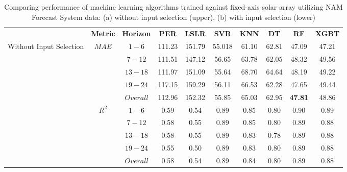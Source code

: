 \begin{table}[h]
\begin{center}
    \caption[Comparing performance of machine learning algorithms trained against fixed-axis solar array using NAM Forecast System data, with and without input selection.]{Comparing performance of machine learning algorithms trained against fixed-axis solar array utilizing NAM Forecast System data: (a) without input selection (upper), (b) with input selection (lower)}
    \label{Tab:fs_array_b}
    \begin{tabular}{@{}p{5.3em}ccccccccc@{}}
    \toprule
    & \textbf{Metric} & \textbf{Horizon} & \textbf{PER} & \textbf{LSLR} & \textbf{SVR} & \textbf{KNN} & \textbf{DT} & \textbf{RF} & \textbf{XGBT} \\ \cmidrule(l){1-10} 
    \multirow{10}{5em}{Without Input Selection} & \multirow{5}{*}{$MAE$} & $1 - 6$ & 111.23 & 151.79 & 55.018 & 61.10 & 62.81 & 47.09 & 47.21 \\
                                              &                   & $7 - 12$ & 111.51 & 147.12 & 56.65 & 63.78 & 62.05 & 48.32 & 49.56 \\
                                              &                   & $13 - 18$ & 111.97 & 151.09 & 55.64 & 68.70 & 64.64 & 48.19 & 49.22 \\
                                              &                   & $19 - 24$ & 117.15 & 159.29 & 56.11 & 66.53 & 62.28 & 47.65 & 49.44 \\
                                              &                   & $Overall$ & 112.96 & 152.32 & 55.85 & 65.03 & 62.95 & \textbf{47.81} & 48.86 \\ \cmidrule(lr){2-10}
                                              & \multirow{5}{*}{$R^2$} & $1 - 6$ & 0.59 & 0.54 & 0.89 & 0.85 & 0.80 & 0.90 & 0.89 \\
                                              &                   & $7 - 12$ & 0.58 & 0.55 & 0.89 & 0.85 & 0.80 & 0.89 & 0.88 \\
                                              &                   & $13 - 18$ & 0.58 & 0.55 & 0.89 & 0.83 & 0.78 & 0.89 & 0.88 \\
                                              &                   & $19 - 24$ & 0.55 & 0.50 & 0.89 & 0.83 & 0.80 & 0.89 & 0.88 \\
                                              &                   & $Overall$ & 0.58 & 0.54 & 0.89 & 0.84 & 0.80 & 0.89 & 0.88 \\ 

\end{tabular}
\end{center}
\end{table}
